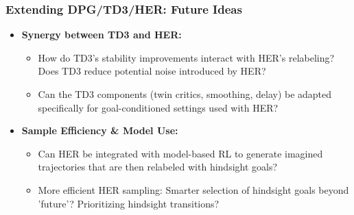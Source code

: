 \documentclass[9pt, aspectratio=169]{beamer}
\begin{document}
\begin{frame}
  \frametitle{Extending DPG/TD3/HER: Future Ideas}

    \begin{itemize}
        \item \textbf{Synergy between TD3 and HER:}
            \begin{itemize}
                \item How do TD3's stability improvements interact with HER's relabeling? Does TD3 reduce potential noise introduced by HER?
                \item Can the TD3 components (twin critics, smoothing, delay) be adapted specifically for goal-conditioned settings used with HER?
            \end{itemize}

        \item \textbf{Sample Efficiency \& Model Use:}
            \begin{itemize}
                \item Can HER be integrated with model-based RL to generate imagined trajectories that are then relabeled with hindsight goals?
                \item More efficient HER sampling: Smarter selection of hindsight goals beyond 'future'? Prioritizing hindsight transitions?
            \end{itemize}
    \end{itemize}
\end{frame}
\end{document}
